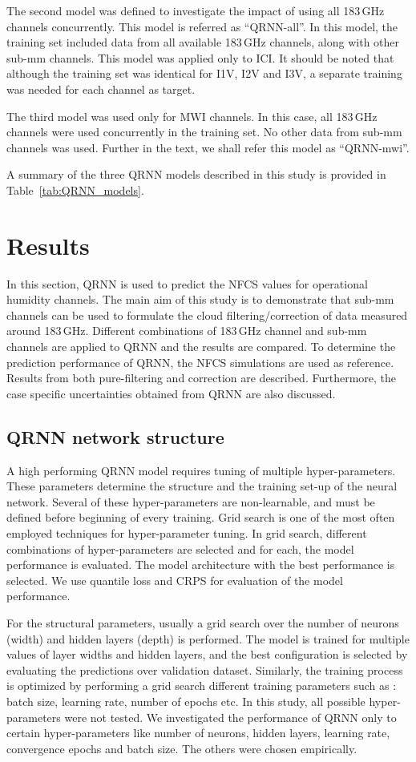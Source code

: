 \documentclass[amt, manuscript]{copernicus}
\begin{document}
The second model was defined to investigate the  impact of using all 183\,GHz channels concurrently. This model is referred as ``QRNN-all''. In this model, the training set included data from all available 183\,GHz channels, along with other sub-mm channels. This model was applied only to ICI. It should be noted that although the training set was identical for I1V, I2V and I3V, a separate training was needed for each channel as target.

The third model was used only for MWI channels. In this case, all 183\,GHz channels were used concurrently in the training set. No other data from sub-mm channels was used. Further in the text, we shall refer this model as ``QRNN-mwi''. 

A summary of the three QRNN models described in this study is provided in Table~\ref{tab:QRNN_models}.

\section{Results}
%
In this section, QRNN is used to predict the NFCS values for operational humidity channels. The main aim of this study is to demonstrate that sub-mm channels can be used to formulate the cloud filtering/correction of data measured around 183\,GHz. Different combinations of 183\,GHz channel and sub-mm channels are applied to QRNN and the results are compared. To determine the prediction performance of QRNN, the NFCS simulations are used as reference. Results from both pure-filtering and correction are described. Furthermore, the case specific uncertainties obtained from QRNN are also discussed.
 
\subsection{QRNN network structure}
%
A high performing QRNN model requires tuning of multiple hyper-parameters. These parameters determine the structure and the training set-up of the neural network. Several of these hyper-parameters are non-learnable, and must be defined before beginning of every training. Grid search is one of the most often employed techniques for hyper-parameter tuning. In grid search, different combinations of hyper-parameters are selected and for each, the model performance is evaluated. The model architecture with the best performance is selected. We use quantile loss and CRPS for evaluation of the model performance. 

For the structural parameters, usually a grid search over the number of neurons (width) and hidden layers (depth) is performed. The model is trained for multiple values of layer widths and hidden layers, and the best configuration is selected by evaluating the predictions over validation dataset. Similarly, the training process is optimized by performing a grid search different training parameters such as : batch size, learning rate, number of epochs etc. In this study, all possible hyper-parameters were not tested. We investigated the performance of QRNN only to certain hyper-parameters like number of neurons, hidden layers, learning rate, convergence epochs and batch size. The others were chosen empirically.
\end{document}
